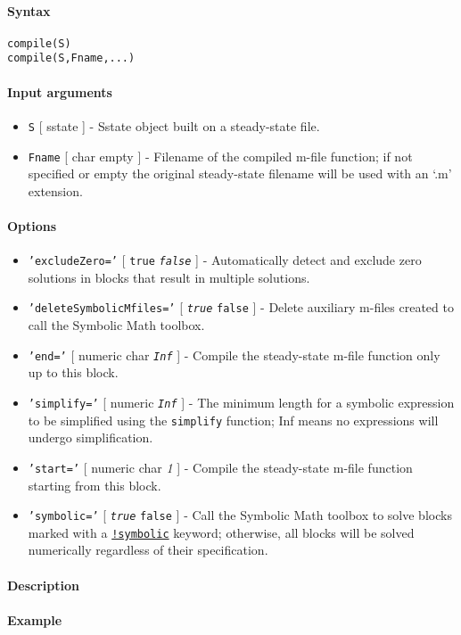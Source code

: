 


	\paragraph{Syntax}\label{syntax}

\begin{verbatim}
compile(S)
compile(S,Fname,...)
\end{verbatim}

\paragraph{Input arguments}\label{input-arguments}

\begin{itemize}
\item
  \texttt{S} {[} sstate {]} - Sstate object built on a steady-state
  file.
\item
  \texttt{Fname} {[} char \textbar{} empty {]} - Filename of the
  compiled m-file function; if not specified or empty the original
  steady-state filename will be used with an `.m' extension.
\end{itemize}

\paragraph{Options}\label{options}

\begin{itemize}
\item
  \texttt{'excludeZero='} {[} \texttt{true} \textbar{}
  \emph{\texttt{false}} {]} - Automatically detect and exclude zero
  solutions in blocks that result in multiple solutions.
\item
  \texttt{'deleteSymbolicMfiles='} {[} \emph{\texttt{true}} \textbar{}
  \texttt{false} {]} - Delete auxiliary m-files created to call the
  Symbolic Math toolbox.
\item
  \texttt{'end='} {[} numeric \textbar{} char \textbar{}
  \emph{\texttt{Inf}} {]} - Compile the steady-state m-file function
  only up to this block.
\item
  \texttt{'simplify='} {[} numeric \textbar{} \emph{\texttt{Inf}} {]} -
  The minimum length for a symbolic expression to be simplified using
  the \texttt{simplify} function; Inf means no expressions will undergo
  simplification.
\item
  \texttt{'start='} {[} numeric \textbar{} char \textbar{} \emph{1} {]}
  - Compile the steady-state m-file function starting from this block.
\item
  \texttt{'symbolic='} {[} \emph{\texttt{true}} \textbar{}
  \texttt{false} {]} - Call the Symbolic Math toolbox to solve blocks
  marked with a \href{sstatelang/symbolic}{\texttt{!symbolic}} keyword;
  otherwise, all blocks will be solved numerically regardless of their
  specification.
\end{itemize}

\paragraph{Description}\label{description}

\paragraph{Example}\label{example}


